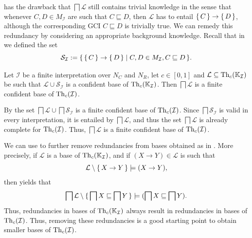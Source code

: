  has the drawback
that $\bigsqcap \mathcal{L}$ still contains trivial knowledge in the sense that whenever
$C, D \in M_{\mathcal{I}}$ are such that $C \sqsubseteq D$, then $\mathcal{L}$ has to
entail ${\{\, C \,\}} \to {\ensuremath{\{\, D \,\}}}$, although the corresponding GCI $C \sqsubseteq D$ is
trivially true.  We can remedy this redundancy by considering an appropriate background
knowledge.  Recall that in  we defined the set
\begin{equation*}
  \mathcal{S}_{\mathcal{I}} := {\{\, {\{\, C \,\}} \to {\ensuremath{\{\, D \,\}}} \mid C, D \in
    M_{\mathcal{I}}, C \sqsubseteq D \,\}}.
\end{equation*}

\begin{Corollary}
  \label{cor:using-background-knowledge-for-confident-bases}
  Let $\mathcal{I}$ be a finite interpretation over $N_C$ and $N_R$, let $c \in [0,1]$ and
  $\mathcal{L} \subseteq \operatorname{Th}_c({\mathbb{K}}_{\mathcal{I}})$ be such that $\mathcal{L} \cup
  \mathcal{S}_{\mathcal{I}}$ is a confident base of $\operatorname{Th}_c({\mathbb{K}}_{\mathcal{I}})$.  Then
  $\bigsqcap \mathcal{L}$ is a finite confident base of $\operatorname{Th}_c(\mathcal{I})$.
\end{Corollary}
\begin{Proof}
  By  the set
  $\bigsqcap \mathcal{L} \cup \bigsqcap \mathcal{S}_{\mathcal{I}}$ is a finite confident
  base of $\operatorname{Th}_c(\mathcal{I})$.  Since $\bigsqcap \mathcal{S}_{\mathcal{I}}$ is valid in
  every interpretation, it is entailed by $\bigsqcap \mathcal{L}$, and thus the set
  $\bigsqcap \mathcal{L}$ is already complete for $\operatorname{Th}_c(\mathcal{I})$.  Thus, $\bigsqcap
  \mathcal{L}$ is a finite confident base of $\operatorname{Th}_c(\mathcal{I})$.
\end{Proof}

We can use  to further remove
redundancies from bases obtained as in
.  More precisely,
if $\mathcal{L}$ is a base of $\operatorname{Th}_c({\mathbb{K}}_{\mathcal{I}})$, and if $(X \to Y) \in
\mathcal{L}$ is such that
\begin{equation*}
  \mathcal{L} \setminus {\ensuremath{\{\, X \to Y \,\}}} \models (X \to Y),
\end{equation*}
then  yields that
\begin{equation*}
  \bigsqcap \mathcal{L} \setminus {\ensuremath{\{\, \bigsqcap X \sqsubseteq \bigsqcap Y \,\}}} \models (
  \bigsqcap X \sqsubseteq \bigsqcap Y).
\end{equation*}
Thus, redundancies in bases of $\operatorname{Th}_c({\mathbb{K}}_{\mathcal{I}})$ always result in redundancies
in bases of $\operatorname{Th}_c(\mathcal{I})$.  Thus, removing these redundancies is a good starting
point to obtain smaller bases of $\operatorname{Th}_c(\mathcal{I})$.

